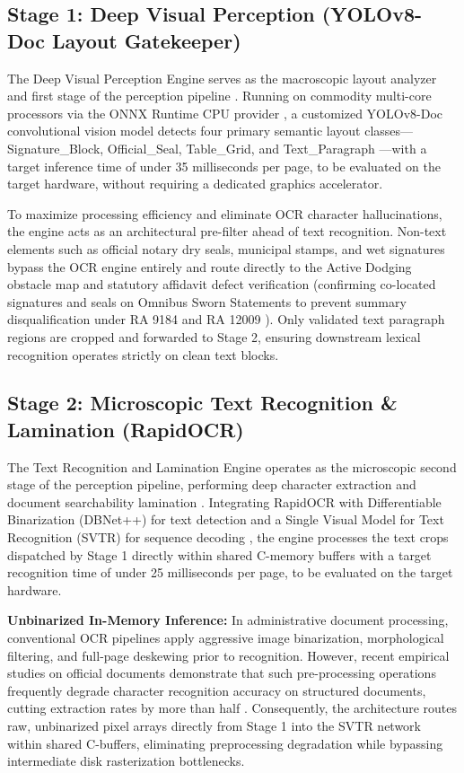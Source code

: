 \subsection{Stage 1: Deep Visual Perception (YOLOv8-Doc Layout Gatekeeper)}
The Deep Visual Perception Engine serves as the macroscopic layout analyzer and first stage of the perception pipeline \cite{ref29,ref30}. Running on commodity multi-core processors via the ONNX Runtime CPU provider \cite{ref32,ref33}, a customized YOLOv8-Doc convolutional vision model detects four primary semantic layout classes---Signature\_Block, Official\_Seal, Table\_Grid, and Text\_Paragraph \cite{ref49}---with a target inference time of under 35 milliseconds per page, to be evaluated on the target hardware, without requiring a dedicated graphics accelerator.

To maximize processing efficiency and eliminate OCR character hallucinations, the engine acts as an architectural pre-filter ahead of text recognition.
Non-text elements such as official notary dry seals, municipal stamps, and wet signatures bypass the OCR engine entirely and route directly to the Active Dodging obstacle map and statutory affidavit defect verification (confirming co-located signatures and seals on Omnibus Sworn Statements to prevent summary disqualification under RA 9184 \cite{ref1} and RA 12009 \cite{ref2}).
Only validated text paragraph regions are cropped and forwarded to Stage 2, ensuring downstream lexical recognition operates strictly on clean text blocks.

\subsection{Stage 2: Microscopic Text Recognition \& Lamination (RapidOCR)}
The Text Recognition and Lamination Engine operates as the microscopic second stage of the perception pipeline, performing deep character extraction and document searchability lamination \cite{ref22}. Integrating RapidOCR with Differentiable Binarization (DBNet++) for text detection \cite{ref23} and a Single Visual Model for Text Recognition (SVTR) for sequence decoding \cite{ref24}, the engine processes the text crops dispatched by Stage 1 directly within shared C-memory buffers with a target recognition time of under 25 milliseconds per page, to be evaluated on the target hardware.

\textbf{Unbinarized In-Memory Inference:} In administrative document processing, conventional OCR pipelines apply aggressive image binarization, morphological filtering, and full-page deskewing prior to recognition. However, recent empirical studies on official documents demonstrate that such pre-processing operations frequently degrade character recognition accuracy on structured documents, cutting extraction rates by more than half \cite{docxb2}. Consequently, the architecture routes raw, unbinarized pixel arrays directly from Stage 1 into the SVTR network within shared C-buffers, eliminating preprocessing degradation while bypassing intermediate disk rasterization bottlenecks.

